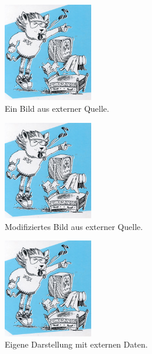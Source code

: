 \begin{figure}[h]
        \centering
            \includegraphics[width=0.35\textwidth]{img/latex.jpg}    %
            \caption[\LaTeX~Logo]
                {Ein Bild aus externer Quelle.}
            \label{fig:texlogo2}
\end{figure}

\begin{figure}[h]
        \centering
            \includegraphics[width=0.35\textwidth]{img/latex.jpg}    %
            \caption[\LaTeX~Logo]
                {Modifiziertes Bild aus externer Quelle.}
            \label{fig:texlogo3}
\end{figure}

\begin{figure}[h]
        \centering
            \includegraphics[width=0.35\textwidth]{img/latex.jpg}    %
            \caption[\LaTeX~Logo]
                {Eigene Darstellung mit externen Daten.}
            \label{fig:texlogo4}
\end{figure}


